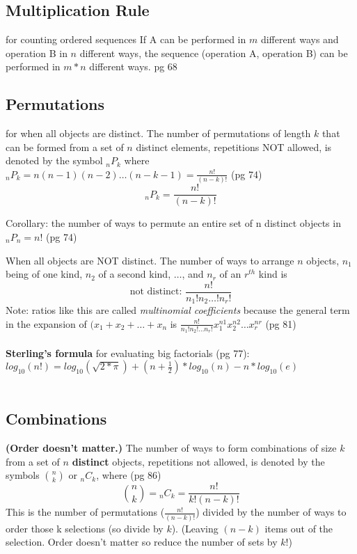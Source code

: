\subsection{Multiplication Rule} for counting ordered sequences
If A can be performed in $m$ different ways and operation B in $n$ different ways, the sequence (operation A, operation B) can be performed in $m*n$ different ways. {\tiny pg 68}

\subsection{Permutations} for when all objects are distinct.
The number of permutations of length $k$ that can be formed from a set of $n$ distinct elements, repetitions NOT allowed, is denoted by the symbol ${_n}P_k$ where ${_n}P_k = n(n-1)(n-2) \dots (n - k - 1) = \frac{n!}{(n-k)!}$  {\tiny (pg 74) }\hfill \\
\[  {_n}P_k = \frac{n!}{(n-k)!} \]

Corollary: the number of ways to permute an entire set of n distinct objects in ${_n}P_n = n!$    {\tiny (pg 74) }\

When all objects are NOT distinct.  The number of ways to arrange $n$ objects, $n_1$ being of one kind, $n_2$ of a second kind, $\dots$, and $n_r$ of an $r^{th}$ kind is 
\[ \mbox{not distinct: } \frac{n!}{n{_1}!n{_2} \dots !n{_r!}} \]
Note: ratios like this are called \textit{multinomial coefficients} because the general term in the expansion of $(x_1 + x_2 + \dots + x_n$ is $\frac{n!}{n_1!n_2!\dots n_r!}x_1^{n1}x_2^{n2} \dots x_r^{nr}$  {\tiny (pg 81) }\hfill \\
\hfill \\
\textbf{Sterling's formula} for evaluating big factorials {\tiny (pg 77)}: $log_{10}(n!) = log_{10}(\sqrt{2*\pi}) + (n + \frac{1}{2})*log_{10}(n) - n*log_{10}(e)$ \hfill \\
\hfill \\

\subsection{Combinations}
\textbf{(Order doesn't matter.)} The number of ways to form combinations of size $k$ from a set of $n$ \textbf{distinct} objects, repetitions not allowed, is denoted by the symbols $\binom{n}{k}$ or ${_n}C_k$, where   {\tiny (pg 86)}
	\[ {n \choose k} = {_n}C_k = \frac{n!}{k!(n-k)!} \]
This is the number of permutations ($\frac{n!}{(n-k)!}$) divided by the number of ways to order those k selections (so divide by $k$).
(Leaving $(n-k)$ items out of the selection.  Order doesn't matter so reduce the number of sets by $k!$) \hfill \\

